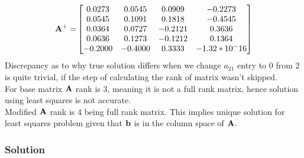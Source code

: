 \begin{equation*}
    \mathbf{A^+ = }
    \begin{bmatrix}
        0.0273  &  0.0545  &  0.0909  & -0.2273 \\
        0.0545  &  0.1091  &  0.1818  & -0.4545 \\
        0.0364  &  0.0727  & -0.2121  &  0.3636 \\
        0.0636  &  0.1273  & -0.1212  &  0.1364 \\
        -0.2000 &  -0.4000 &   0.3333 &  -1.32 * 10^-16 \\
    \end{bmatrix}
\end{equation*}
Discrepancy as to why true solution differs when we change $a_{21}$ entry to 0 from 2 is quite trivial, if the step of calculating the rank of matrix wasn't skipped.\\
For base matrix $\mathbf{A}$ rank is 3, meaning it is not a full rank matrix, hence solution using least squares is not accurate.\\
Modified $\mathbf{A}$ rank is 4 being full rank matrix. This implies unique solution for least squares problem given that $\mathbf{b}$ is in the column space of $\mathbf{A}$.
\subsubsection*{Solution}
